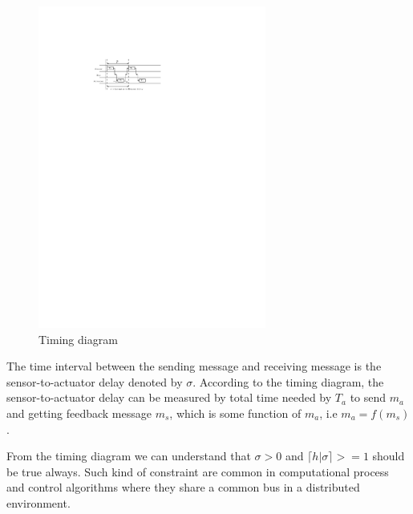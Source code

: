 \begin{figure}
\begin{center}
\includegraphics[width=75mm]{timing_diagram_deadline_cosntraint.pdf}
\end{center}
\caption{Timing diagram}
\label{tim_dig}
\end{figure}


The time interval between the sending message and receiving message is the
sensor-to-actuator delay denoted by $\sigma$. According to the timing diagram,
the sensor-to-actuator delay can be measured by total time needed by $T_a$
to send $m_a$ and getting feedback message $m_s$, which is some function of $m_a$,
i.e $m_a = f(m_s)$. 

From the timing diagram we can understand that $\sigma > 0$ and $\lceil{h|\sigma}\rceil >= 1$
should be true always. Such kind of constraint are common in computational process and 
control algorithms where they share a common bus in a distributed environment.



